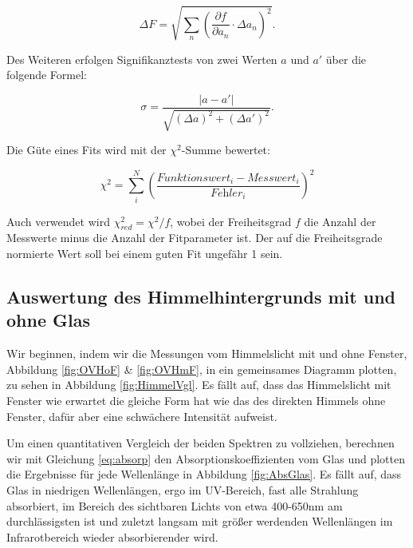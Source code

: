 \documentclass{article}
\begin{document}
\begin{equation}
    \Delta F = \sqrt{\sum_n \left( \frac{\partial f}{\partial a_n} \cdot \Delta a_n \right)^2}.
\end{equation}

Des Weiteren erfolgen Signifikanztests von zwei Werten $a$ und $a'$ über die folgende Formel:

\begin{equation}
    \sigma = \frac{|a-a'|}{\sqrt{(\Delta a)^2 + (\Delta a')^2}}.
\end{equation}

Die Güte eines Fits wird mit der $\chi^2$-Summe bewertet:

\begin{equation}
    \chi^2 = \sum_i^N \left( \frac{\textit{Funktionswert}_i - \textit{Messwert}_i}{\textit{Fehler}_i} \right)^2
\end{equation}

Auch verwendet wird $\chi^2_{red} = \chi^2 / f$, wobei der Freiheitsgrad $f$ die Anzahl der Messwerte minus die Anzahl der Fitparameter ist. Der auf die Freiheitsgrade normierte Wert soll bei einem guten Fit ungefähr 1 sein.

\newpage

\subsection{Auswertung des Himmelhintergrunds mit und ohne Glas}

Wir beginnen, indem wir die Messungen vom Himmelslicht mit und ohne Fenster, Abbildung \ref{fig:OVHoF} \& \ref{fig:OVHmF}, in ein gemeinsames Diagramm plotten, zu sehen in Abbildung \ref{fig:HimmelVgl}. Es fällt auf, dass das Himmelslicht mit Fenster wie erwartet die gleiche Form hat wie das des direkten Himmels ohne Fenster, dafür aber eine schwächere Intensität aufweist.

Um einen quantitativen Vergleich der beiden Spektren zu vollziehen, berechnen wir mit Gleichung \ref{eq:absorp} den Absorptionskoeffizienten vom Glas und plotten die Ergebnisse für jede Wellenlänge in Abbildung \ref{fig:AbsGlas}. Es fällt auf, dass Glas in niedrigen Wellenlängen, ergo im UV-Bereich, fast alle Strahlung absorbiert, im Bereich des sichtbaren Lichts von etwa 400-650nm am durchlässigsten ist und zuletzt langsam mit größer werdenden Wellenlängen im Infrarotbereich wieder absorbierender wird. 

\phantom{.}
\end{document}
